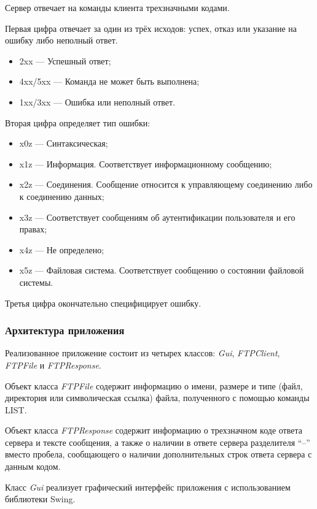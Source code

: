 Сервер отвечает на команды клиента трехзначными кодами.

Первая цифра отвечает за один из трёх исходов: успех, отказ или указание на ошибку либо неполный ответ.

\begin{itemize}
	\item 2xx --- Успешный ответ;
	\item 4xx/5xx --- Команда не может быть выполнена;
	\item 1xx/3xx --- Ошибка или неполный ответ.
\end{itemize}

Вторая цифра определяет тип ошибки:

\begin{itemize}
	\item x0z --- Синтаксическая;
	\item x1z --- Информация. Соответствует информационному сообщению;
	\item x2z --- Соединения. Сообщение относится к управляющему соединению либо к соединению данных;
	\item x3z --- Соответствует сообщениям об аутентификации пользователя и его правах;
	\item x4z --- Не определено;
	\item x5z --- Файловая система. Соответствует сообщению о состоянии файловой системы.
\end{itemize}

Третья цифра окончательно специфицирует ошибку.

\subsubsection{Архитектура приложения}

Реализованное приложение состоит из четырех классов: \textit{Gui}, \textit{FTPClient}, \textit{FTPFile} и \textit{FTPResponse}.

Объект класса \textit{FTPFile} содержит информацию о имени, размере и типе (файл, директория или символическая ссылка) файла, полученного с помощью команды LIST.

Объект класса \textit{FTPResponse} содержит информацию о трехзначном коде ответа сервера и тексте сообщения, а также о наличии в ответе сервера разделителя "`--"' вместо пробела, сообщающего о наличии дополнительных строк ответа сервера с данным кодом.

Класс \textit{Gui} реализует графический интерфейс приложения с использованием библиотеки Swing.

